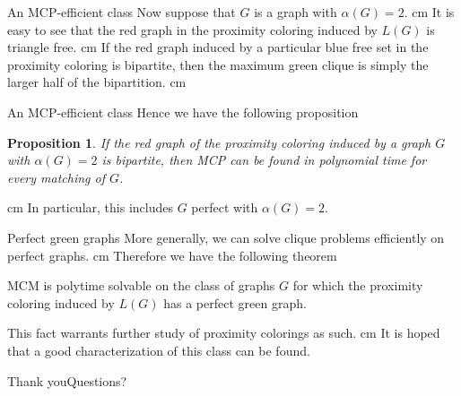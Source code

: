 \documentclass{beamer}
\newtheorem{prop}{Proposition}
\newcommand{\bframe}[2]{\begin{frame}{#1}#2\end{frame}}
\begin{document}
\bframe{An MCP-efficient class}{
	Now suppose that $G$ is a graph with $\alpha(G) = 2$. \pause\vskip 0.5 cm
	It is easy to see that the red graph in the proximity coloring induced by $L(G)$ is triangle free.\pause\vskip 0.5 cm
	If the red graph induced by a particular blue free set in the proximity coloring is bipartite, then the maximum green clique is simply the larger half of the bipartition.\pause{} cm
	
	}

\bframe{An MCP-efficient class}{
	Hence we have the following proposition \pause
	\begin{prop}
		If the red graph of the proximity coloring induced by a graph $G$ with $\alpha(G) = 2$ is bipartite, then MCP can be found in polynomial time for every matching of $G$.
	\end{prop}\pause\vskip 0.5 cm
	In particular, this includes $G$ perfect with $\alpha(G)= 2$.\pause{}cm
	}

\bframe{Perfect green graphs}{
	More generally, we can solve clique problems efficiently on perfect graphs. \pause\vskip 0.5 cm
	Therefore we have the following theorem
	\begin{theorem}
		MCM is polytime solvable on the class of graphs $G$ for which the proximity coloring induced by $L(G)$ has a perfect green graph.
	\end{theorem}\pause
	This fact warrants further study of proximity colorings as such. \pause\vskip 0.5 cm
	It is hoped that a good characterization of this class can be found.}

\bframe{Thank you}{Questions?}

\end{document}
